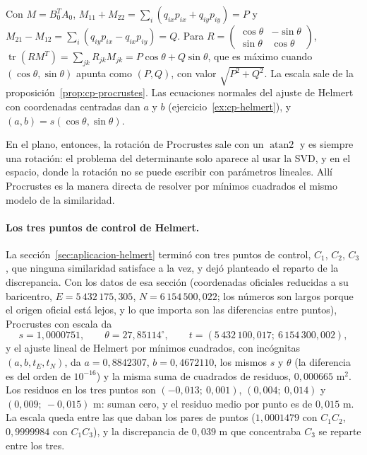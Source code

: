 \begin{demostracion}
Con \(M=B_0^TA_0\), \(M_{11}+M_{22}=\sum_i(q_{ix}p_{ix}+q_{iy}p_{iy})=P\) y
\(M_{21}-M_{12}=\sum_i(q_{iy}p_{ix}-q_{ix}p_{iy})=Q\). Para
\(R=\left(\begin{smallmatrix}\cos\theta&-\sin\theta\\\sin\theta&\cos\theta\end{smallmatrix}\right)\),
\(\operatorname{tr}(RM^T)=\sum_{jk}R_{jk}M_{jk}=P\cos\theta+Q\sin\theta\), que es máximo
cuando \((\cos\theta,\sin\theta)\) apunta como \((P,Q)\), con valor \(\sqrt{P^2+Q^2}\). La
escala sale de la proposición~\ref{prop:cp-procrustes}. Las ecuaciones normales del
ajuste de Helmert con coordenadas centradas dan \(a\) y \(b\)
(ejercicio~\ref{ex:cp-helmert}), y \((a,b)=s(\cos\theta,\sin\theta)\).
\end{demostracion}

En el plano, entonces, la rotación de Procrustes sale con un \(\operatorname{atan2}\) y es
siempre una rotación: el problema del determinante solo aparece al usar la SVD, y en el
espacio, donde la rotación no se puede escribir con parámetros lineales. Allí Procrustes es
la manera directa de resolver por mínimos cuadrados el mismo modelo de la similaridad.

\paragraph{Los tres puntos de control de Helmert.} La sección~\ref{sec:aplicacion-helmert}
terminó con tres puntos de control, \(C_1\), \(C_2\), \(C_3\), que ninguna similaridad
satisface a la vez, y dejó planteado el reparto de la discrepancia. Con los datos de esa
sección (coordenadas oficiales reducidas a su baricentro, \(E=5\,432\,175{,}305\),
\(N=6\,154\,500{,}022\); los números son largos porque el origen oficial está lejos, y lo que
importa son las diferencias entre puntos), Procrustes con escala da
\[
  s=1{,}0000751,\qquad \theta=27{,}85114^\circ,\qquad
  t=(5\,432\,100{,}017;\ 6\,154\,300{,}002),
\]
y el ajuste lineal de Helmert por mínimos cuadrados, con incógnitas \((a,b,t_E,t_N)\), da
\(a=0{,}8842307\), \(b=0{,}4672110\), los mismos \(s\) y \(\theta\) (la diferencia es del
orden de \(10^{-16}\)) y la misma suma de cuadrados de residuos, \(0{,}000665\) m\(^2\). Los
residuos en los tres puntos son \((-0{,}013;\ 0{,}001)\), \((0{,}004;\ 0{,}014)\) y
\((0{,}009;\ -0{,}015)\) m: suman cero, y el residuo medio por punto es de \(0{,}015\) m. La
escala queda entre las que daban los pares de puntos (\(1{,}0001479\) con \(C_1C_2\),
\(0{,}9999984\) con \(C_1C_3\)), y la discrepancia de \(0{,}039\) m que concentraba \(C_3\)
se reparte entre los tres.

